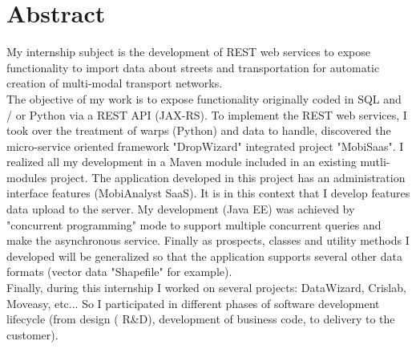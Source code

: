 \chapter*{Abstract}

My internship subject is the development of REST web services to expose functionality to import data about streets and transportation for automatic creation of multi-modal transport networks.\\

The objective of my work is to expose functionality originally coded in SQL and / or Python via a REST API (JAX-RS). To implement the REST web services, I took over the treatment of warps (Python) and data to handle, discovered the micro-service oriented framework "DropWizard" integrated project "MobiSaas". I realized all my development in a Maven module included in an existing mutli-modules project. The application developed in this project has an administration interface features (MobiAnalyst SaaS). It is in this context that I develop features data upload to the server. My development (Java EE) was achieved by "concurrent programming" mode to support multiple concurrent queries and make the asynchronous service. Finally as prospects, classes and utility methods I developed will be generalized so that the application supports several other data formats (vector data "Shapefile" for example).\\

Finally, during this internship I worked on several projects: DataWizard, Crislab, Moveasy, etc... So I participated in different phases of software development lifecycle (from design ( R\&D), development of business code, to delivery to the customer).\\